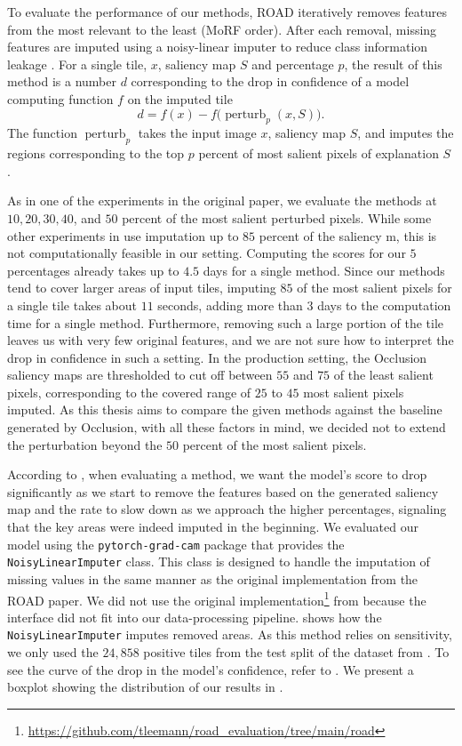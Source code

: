 To evaluate the performance of our methods, ROAD iteratively removes features from the most relevant to the least (MoRF order).
After each removal, missing features are imputed using a noisy-linear imputer to reduce class information leakage \cite{road}.
For a single tile, $x$, saliency map $S$ and percentage $p$, the result of this method is a number $d$ corresponding to the drop in confidence of a model computing function $f$ on the imputed tile
\begin{equation}
    d = f(x) - f\bigl(\operatorname{perturb}_p(x, S)\bigr).
\end{equation}
The function $\operatorname{perturb}_p$ takes the input image $x$, saliency map $S$, and imputes the regions corresponding to the top $p$ percent of most salient pixels of explanation $S$ \cite{road}.

As in one of the experiments in the original paper, we evaluate the methods at $10, 20, 30, 40$, and $50$ percent of the most salient perturbed pixels.
While some other experiments in \cite{road} use imputation up to $85$ percent of the saliency m, this is not computationally feasible in our setting.
Computing the scores for our $5$ percentages already takes up to $4.5$ days for a single method.
Since our methods tend to cover larger areas of input tiles, imputing $85$ of the most salient pixels for a single tile takes about $11$ seconds, adding more than $3$ days to the computation time for a single method.
Furthermore, removing such a large portion of the tile leaves us with very few original features, and we are not sure how to interpret the drop in confidence in such a setting.
In the production setting, the Occlusion saliency maps are thresholded to cut off between $55$ and $75$ of the least salient pixels, corresponding to the covered range of $25$ to $45$ most salient pixels imputed.
As this thesis aims to compare the given methods against the baseline generated by Occlusion, with all these factors in mind, we decided not to extend the perturbation beyond the $50$ percent of the most salient pixels.

According to \cite{road}, when evaluating a method, we want the model's score to drop significantly as we start to remove the features based on the generated saliency map and the rate to slow down as we approach the higher percentages, signaling that the key areas were indeed imputed in the beginning.
We evaluated our model using the \texttt{pytorch-grad-cam} package that provides the \texttt{NoisyLinearImputer} class.
This class is designed to handle the imputation of missing values in the same manner as the original implementation from the ROAD paper.
We did not use the original implementation\footnote{\url{https://github.com/tleemann/road_evaluation/tree/main/road}} from \cite{road} because the interface did not fit into our data-processing pipeline.
 shows how the \texttt{NoisyLinearImputer} imputes removed areas.
As this method relies on sensitivity, we only used the $24,858$ positive tiles from the test split of the dataset from .
To see the curve of the drop in the model's confidence, refer to .
We present a boxplot showing the distribution of our results in .

